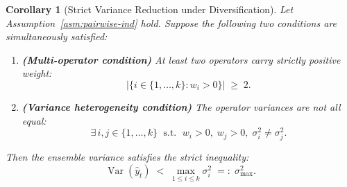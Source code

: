 \documentclass[12pt,openany]{book}
\numberwithin{equation}{chapter}
\theoremstyle{plain}
\newtheorem{corollary}[theorem]{Corollary}
\theoremstyle{definition}
\theoremstyle{remark}
\numberwithin{equation}{chapter}
\theoremstyle{plain}
\DeclareMathOperator{\Var}{Var}
\begin{document}
\begin{corollary}[Strict Variance Reduction under Diversification]
\label{cor:var-reduction}
Let Assumption~\ref{asm:pairwise-ind} hold.
Suppose the following two conditions are simultaneously satisfied:
\begin{enumerate}
  \item \textbf{(Multi-operator condition)}
        At least two operators carry strictly positive weight:
        \begin{equation}
          \bigl|\{i \in \{1,\ldots,k\} : w_i > 0\}\bigr| \;\geq\; 2.
          \label{eq:multi-op}
        \end{equation}
  \item \textbf{(Variance heterogeneity condition)}
        The operator variances are not all equal:
        \begin{equation}
          \exists\, i,j \in \{1,\ldots,k\}
            \;\text{ s.t. }\;
            w_i > 0,\; w_j > 0,\;
            \sigma_i^2 \neq \sigma_j^2.
          \label{eq:var-het}
        \end{equation}
\end{enumerate}
Then the ensemble variance satisfies the \emph{strict} inequality:
\begin{equation}
  \Var(\hat{y}_t)
    \;<\;
    \max_{1 \leq i \leq k} \sigma_i^2
    \;=:\; \sigma_{\max}^2.
  \label{eq:strict-reduction}
\end{equation}
\end{corollary}
\end{document}
